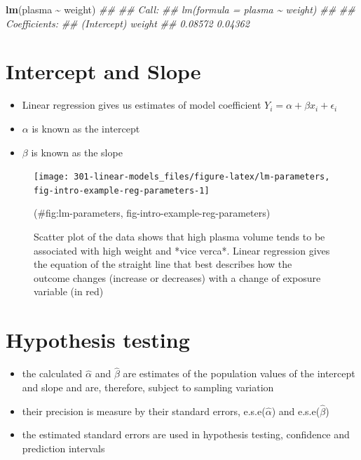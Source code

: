 \documentclass[
]{book}
\newenvironment{Shaded}{\begin{snugshade}}{\end{snugshade}}
\newcommand{\CommentTok}[1]{\textcolor[rgb]{0.56,0.35,0.01}{\textit{#1}}}
\newcommand{\KeywordTok}[1]{\textcolor[rgb]{0.13,0.29,0.53}{\textbf{#1}}}
\newcommand{\NormalTok}[1]{#1}
\newcommand{\OperatorTok}[1]{\textcolor[rgb]{0.81,0.36,0.00}{\textbf{#1}}}
\newcommand{\StringTok}[1]{\textcolor[rgb]{0.31,0.60,0.02}{#1}}
\providecommand{\tightlist}{%
  \setlength{\itemsep}{0pt}\setlength{\parskip}{0pt}}
\theoremstyle{definition}
\theoremstyle{definition}
\theoremstyle{definition}
\theoremstyle{remark}
\begin{document}
\begin{Shaded}
\begin{Highlighting}[]
\KeywordTok{lm}\NormalTok{(plasma }\OperatorTok{\textasciitilde{}}\StringTok{ }\NormalTok{weight)}
\CommentTok{\#\# }
\CommentTok{\#\# Call:}
\CommentTok{\#\# lm(formula = plasma \textasciitilde{} weight)}
\CommentTok{\#\# }
\CommentTok{\#\# Coefficients:}
\CommentTok{\#\# (Intercept)       weight  }
\CommentTok{\#\#     0.08572      0.04362}
\end{Highlighting}
\end{Shaded}

\hypertarget{intercept-and-slope}{%
\section{Intercept and Slope}\label{intercept-and-slope}}

\begin{itemize}
\tightlist
\item
  Linear regression gives us estimates of model coefficient \(Y_i = \alpha + \beta x_i + \epsilon_i\)
\item
  \(\alpha\) is known as the intercept
\item
  \(\beta\) is known as the slope
\end{itemize}

\begin{figure}

{\centering \texttt{[image: 301-linear-models\_files/figure-latex/lm-parameters, fig-intro-example-reg-parameters-1]} 

}

\caption{Scatter plot of the data shows that high plasma volume tends to be associated with high weight and *vice verca*. Linear regression gives the equation of the straight line that best describes how the outcome changes (increase or decreases) with a change of exposure variable (in red)}(\#fig:lm-parameters, fig-intro-example-reg-parameters)
\end{figure}

\hypertarget{hypothesis-testing}{%
\section{Hypothesis testing}\label{hypothesis-testing}}

\begin{itemize}
\tightlist
\item
  the calculated \(\hat{\alpha}\) and \(\hat{\beta}\) are estimates of the population values of the intercept and slope and are, therefore, subject to sampling variation
\item
  their precision is measure by their standard errors, e.s.e(\(\hat{\alpha}\)) and e.s.e(\(\hat{\beta}\))
\item
  the estimated standard errors are used in hypothesis testing, confidence and prediction intervals
\end{itemize}
\end{document}
